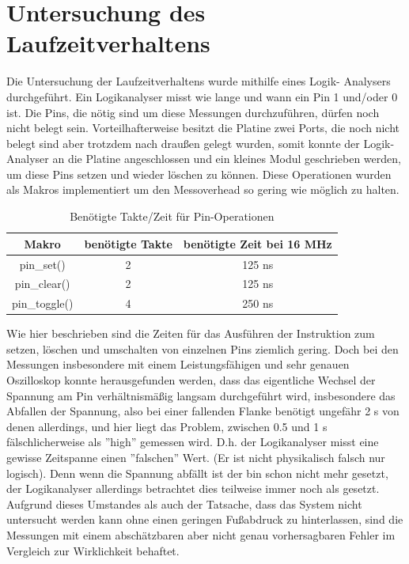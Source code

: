 \chapter{Untersuchung des Laufzeitverhaltens}
Die Untersuchung der Laufzeitverhaltens wurde mithilfe eines Logik-
Analysers durchgeführt. Ein Logikanalyser misst wie lange und wann
ein Pin 1 und/oder 0 ist. Die Pins, die nötig sind um diese Messungen
durchzuführen, dürfen noch nicht belegt sein. Vorteilhafterweise
besitzt die Platine zwei Ports, die noch nicht belegt sind aber
trotzdem nach draußen gelegt wurden, somit konnte der Logik-
Analyser an die Platine angeschlossen und ein kleines Modul
geschrieben werden, um diese Pins setzen und wieder löschen zu
können. Diese Operationen wurden als Makros implementiert um den
Messoverhead so gering wie möglich zu halten.
\begin{table}[htb]
\begin{center}
	\begin{tabular}{|c||c|c|}
		\hline
		\textbf{Makro} & \textbf{benötigte Takte} & \textbf{benötigte Zeit bei 16 MHz} \\ \hline \hline
		pin\_set() & 2 & 125 ns \\ \hline
		pin\_clear() & 2 & 125 ns \\ \hline
		pin\_toggle() & 4 & 250 ns \\ \hline
	\end{tabular}
	\caption{\label{pin_takte} Benötigte Takte/Zeit für Pin-Operationen}
\end{center}
\end{table}
Wie hier beschrieben sind die Zeiten für das Ausführen der Instruktion
zum setzen, löschen und umschalten von einzelnen Pins ziemlich gering.
Doch bei den Messungen insbesondere mit einem Leistungsfähigen und
sehr genauen Oszilloskop konnte herausgefunden werden, dass das eigentliche
Wechsel der Spannung am Pin verhältnismäßig langsam durchgeführt wird,
insbesondere das Abfallen der Spannung, also bei einer fallenden Flanke
benötigt ungefähr 2 \textmu{}s von denen allerdings, und hier liegt das Problem,
zwischen 0.5 und 1 \textmu{}s fälschlicherweise als ''high'' gemessen wird.
D.h. der Logikanalyser misst eine gewisse Zeitspanne einen ''falschen'' Wert.
(Er ist nicht physikalisch falsch nur logisch). Denn wenn die Spannung abfällt
ist der bin schon nicht mehr gesetzt, der Logikanalyser allerdings betrachtet
dies teilweise immer noch als gesetzt.
Aufgrund dieses Umstandes als auch der Tatsache, dass das System nicht untersucht
werden kann ohne einen geringen Fußabdruck zu hinterlassen, sind die Messungen mit
einem abschätzbaren aber nicht genau vorhersagbaren Fehler im Vergleich zur
Wirklichkeit behaftet.
